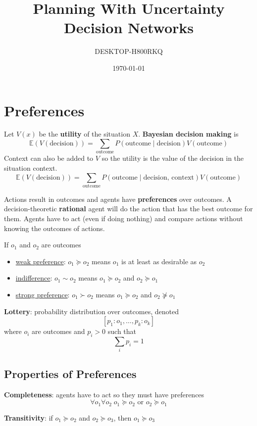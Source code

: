 \documentclass[11pt]{article}
\author{DESKTOP-H800RKQ}
\date{\today}
\title{Planning With Uncertainty Decision Networks}
\begin{document}
\maketitle
\tableofcontents

\section{Preferences}
\label{sec:org1bb6cb5}
Let \(V(x)\) be the \textbf{utility} of the situation \(X\).
\textbf{Bayesian decision making} is
$$ \mathbb{E}(V(\text{decision})) = \sum_{\text{outcome}} P(\text{outcome} \mid \text{decision}) V(\text{outcome}) $$
Context can also be added to \(V\) so the utility is the value of the decision in the situation context.
$$ \mathbb{E}(V(\text{decision})) = \sum_{\text{outcome}} P(\text{outcome} \mid \text{decision, context}) V(\text{outcome}) $$

Actions result in outcomes and agents have \textbf{preferences} over outcomes.
A decision-theoretic \textbf{rational} agent will do the action that has the best outcome for them.
Agents have to act (even if doing nothing) and compare actions without knowing the
outcomes of actions.

If \(o_{1}\) and \(o_{2}\) are outcomes
\begin{itemize}
\item \uline{weak preference}: \(o_{1} \succeq o_{2}\) means \(o_{1}\) is at least as desirable as \(o_{2}\)
\item \uline{indifference}: \(o_{1} \sim o_{2}\) means \(o_{1} \succeq o_{2}\) and \(o_{2} \succeq o_{1}\)
\item \uline{strong preference}: \(o_{1} \succ o_{2}\) means \(o_{1} \succeq o_{2}\) and \(o_{2} \not\succeq o_{1}\)
\end{itemize}


\textbf{Lottery}: probability distribution over outcomes, denoted
$$ [p_{1} : o_{1}, \dots, p_{k} : o_{k}] $$
where \(o_{i}\) are outcomes and \(p_{i} > 0\) such that
$$ \sum_{i} p_{i} = 1 $$
\subsection{Properties of Preferences}
\label{sec:org92ef946}
\textbf{Completeness}: agents have to act so they must have preferences
$$ \forall o_{1} \forall o_{2} \; o_{1} \succeq o_{2} \text{ or } o_{2} \succeq o_{1} $$

\textbf{Transitivity}: if \(o_{1} \succeq o_{2}\) and \(o_{2} \succeq o_{3}\), then \(o_{1} \succeq o_{3}\)
\end{document}
